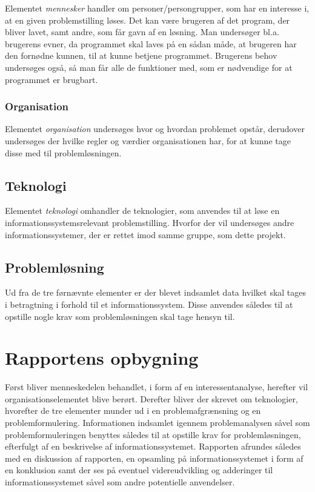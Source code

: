 Elementet \textit{mennesker} handler om personer/persongrupper, som har en interesse i, at en given
problemstilling løses. Det kan være brugeren af det program, der bliver lavet, samt andre, som får gavn af en
løsning. Man undersøger bl.a. brugerens evner, da programmet skal laves på en sådan måde, at brugeren har den
fornødne kunnen, til at kunne betjene programmet. Brugerens behov undersøges også, så man får alle de
funktioner med, som er nødvendige for at programmet er brugbart.


\subsubsection{Organisation}\label{subsec:organisation}

Elementet \textit{organisation} undersøges hvor og hvordan problemet opstår, derudover undersøges der hvilke
regler og værdier organisationen har, for at kunne tage disse med til problemløsningen.


\subsection{Teknologi}\label{subsec:Teknologi}

Elementet \textit{teknologi} omhandler de teknologier, som anvendes til at løse en informationssystemsrelevant
problemstilling. Hvorfor der vil undersøges andre informationssystemer, der er rettet imod samme gruppe, som dette projekt.

\subsection{Problemløsning}
Ud fra de tre førnævnte elementer er der blevet indsamlet data hvilket skal tages i betragtning i forhold til et informationssystem. Disse anvendes således til at opstille nogle krav som problemløsningen skal tage hensyn til.

\section{Rapportens opbygning}\label{sec:rapportens-opbygning}

Først bliver menneskedelen behandlet, i form af en interessentanalyse, herefter vil organisationselementet
blive berørt. Derefter bliver der skrevet om teknologier, hvorefter de tre elementer munder ud i en
problemafgrænsning og en problemformulering. 
Informationen indsamlet igennem problemanalysen såvel som problemformuleringen benyttes således til at opstille krav for problemløsningen, efterfulgt af en beskrivelse af informationssystemet. Rapporten afrundes således med en diskussion af rapporten, en opsamling på informationssystemet i form af en konklusion samt der ses på eventuel videreudvikling og adderinger til informationssystemet såvel som andre potentielle anvendelser.